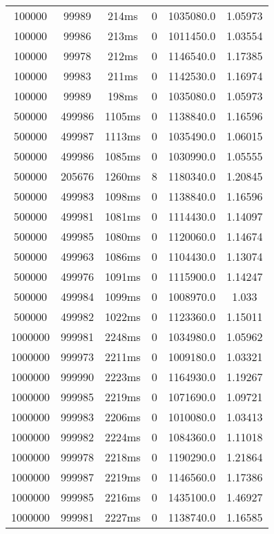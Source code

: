 \documentclass[./main.tex]{subfiles}
\begin{document}
\begin{table}
\begin{tabular}{ c | c | c | c | c | c }
        100000 & 99989 & 214ms & 0 & 1035080.0 & 1.05973 \\
        100000 & 99986 & 213ms & 0 & 1011450.0 & 1.03554 \\
        100000 & 99978 & 212ms & 0 & 1146540.0 & 1.17385 \\
        100000 & 99983 & 211ms & 0 & 1142530.0 & 1.16974 \\
        100000 & 99989 & 198ms & 0 & 1035080.0 & 1.05973 \\
        \hline
        500000 & 499986 & 1105ms & 0 & 1138840.0 & 1.16596 \\
        500000 & 499987 & 1113ms & 0 & 1035490.0 & 1.06015 \\
        500000 & 499986 & 1085ms & 0 & 1030990.0 & 1.05555 \\
        500000 & 205676 & 1260ms & 8 & 1180340.0 & 1.20845 \\
        500000 & 499983 & 1098ms & 0 & 1138840.0 & 1.16596 \\
        500000 & 499981 & 1081ms & 0 & 1114430.0 & 1.14097 \\
        500000 & 499985 & 1080ms & 0 & 1120060.0 & 1.14674 \\
        500000 & 499963 & 1086ms & 0 & 1104430.0 & 1.13074 \\
        \rowcolor{lightgray} 500000 & 499976 & 1091ms & 0 & 1115900.0 & 1.14247 \\
        500000 & 499984 & 1099ms & 0 & 1008970.0 & 1.033 \\
        500000 & 499982 & 1022ms & 0 & 1123360.0 & 1.15011 \\
        \hline
        1000000 & 999981 & 2248ms & 0 & 1034980.0 & 1.05962 \\
        1000000 & 999973 & 2211ms & 0 & 1009180.0 & 1.03321 \\
        1000000 & 999990 & 2223ms & 0 & 1164930.0 & 1.19267 \\
        1000000 & 999985 & 2219ms & 0 & 1071690.0 & 1.09721 \\
        1000000 & 999983 & 2206ms & 0 & 1010080.0 & 1.03413 \\
        1000000 & 999982 & 2224ms & 0 & 1084360.0 & 1.11018 \\
        1000000 & 999978 & 2218ms & 0 & 1190290.0 & 1.21864 \\
        1000000 & 999987 & 2219ms & 0 & 1146560.0 & 1.17386 \\
        1000000 & 999985 & 2216ms & 0 & 1435100.0 & 1.46927 \\
        1000000 & 999981 & 2227ms & 0 & 1138740.0 & 1.16585 \\

\end{tabular}
\end{table}
\end{document}
